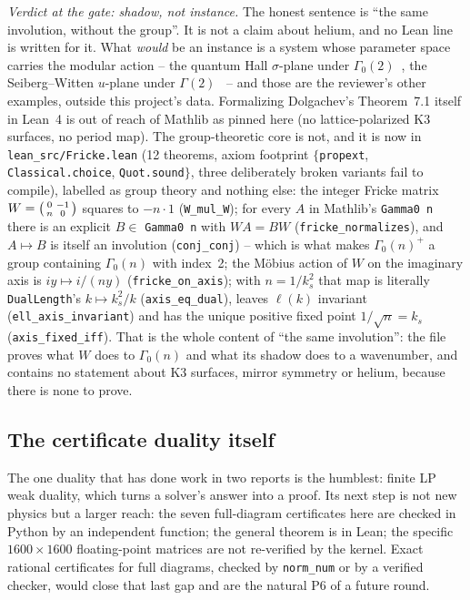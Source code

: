 \documentclass[11pt,a4paper]{article}
\newcommand{\lean}[1]{\texttt{\small #1}}
\begin{document}
\emph{Verdict at the gate: shadow, not instance.} The honest sentence is ``the same involution, without
the group''. It is not a claim about helium, and no Lean line is written for it. What \emph{would} be
an instance is a system whose parameter space carries the modular action -- the quantum Hall
$\sigma$-plane under $\Gamma_0(2)$~\cite{LutkenRoss1992}, the Seiberg--Witten $u$-plane under
$\Gamma(2)$~\cite{SW1994} -- and those are the reviewer's other examples, outside this project's data.
Formalizing Dolgachev's Theorem~7.1 itself in Lean~4 is out of reach of Mathlib as pinned here (no
lattice-polarized K3 surfaces, no period map). The group-theoretic core is not, and it is now in
\lean{lean\_src/Fricke.lean} (12 theorems, axiom footprint $\{$\lean{propext},
\lean{Classical.choice}, \lean{Quot.sound}$\}$, three deliberately broken variants fail to compile),
labelled as group theory and nothing else: the integer Fricke matrix $W=\begin{psmallmatrix}0&-1\\
n&0\end{psmallmatrix}$ squares to $-n\cdot1$ (\lean{W\_mul\_W}); for every $A$ in Mathlib's
\lean{Gamma0 n} there is an explicit $B\in$ \lean{Gamma0 n} with $WA=BW$ (\lean{fricke\_normalizes}),
and $A\mapsto B$ is itself an involution (\lean{conj\_conj}) -- which is what makes $\Gamma_0(n)^+$ a
group containing $\Gamma_0(n)$ with index~2; the Möbius action of $W$ on the imaginary axis is
$iy\mapsto i/(ny)$ (\lean{fricke\_on\_axis}); with $n=1/k_s^2$ that map is literally
\lean{DualLength}'s $k\mapsto k_s^2/k$ (\lean{axis\_eq\_dual}), leaves $\ell(k)$ invariant
(\lean{ell\_axis\_invariant}) and has the unique positive fixed point $1/\sqrt n=k_s$
(\lean{axis\_fixed\_iff}). That is the whole content of ``the same involution'': the file proves what
$W$ does to $\Gamma_0(n)$ and what its shadow does to a wavenumber, and contains no statement about
K3 surfaces, mirror symmetry or helium, because there is none to prove.

\subsection{The certificate duality itself}

The one duality that has done work in two reports is the humblest: finite LP weak duality, which
turns a solver's answer into a proof. Its next step is not new physics but a larger reach: the seven
full-diagram certificates here are checked in Python by an independent function; the general theorem
is in Lean; the specific $1600\times1600$ floating-point matrices are not re-verified by the kernel.
Exact rational certificates for full diagrams, checked by \lean{norm\_num} or by a verified checker,
would close that last gap and are the natural P6 of a future round.
\end{document}
